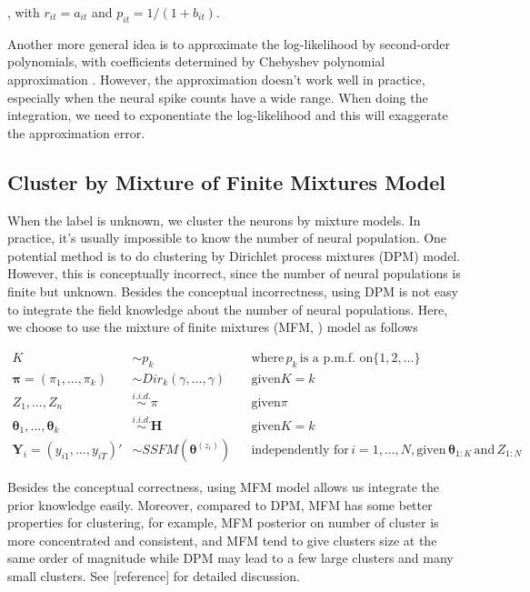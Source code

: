 \documentclass{article}
\begin{document}
	, with $r_{it} = a_{it}$ and $p_{it} = 1/(1 + b_{it})$.
	
	Another more general idea is to approximate the log-likelihood by second-order polynomials, with coefficients determined by Chebyshev polynomial approximation \citet{Keeley2019}. However, the approximation doesn’t work well in practice, especially when the neural spike counts have a wide range. When doing the integration, we need to exponentiate the log-likelihood and this will exaggerate the approximation error.
	
	\subsection{Cluster by Mixture of Finite Mixtures Model}
	When the label is unknown, we cluster the neurons by mixture models. In practice, it’s usually impossible to know the number of neural population. One potential method is to do clustering by Dirichlet process mixtures (DPM) model. However, this is conceptually incorrect, since the number of neural populations is finite but unknown. Besides the conceptual incorrectness, using DPM is not easy to integrate the field knowledge about the number of neural populations. Here, we choose to use the mixture of finite mixtures (MFM, \citet{Miller2018}) model as follows
	
	\begin{align*}
		K &\sim p_k &&\text{where}\, p_k \, \text{is a p.m.f. on} \{1,2,\ldots\}\\
		\bm{\pi}=(\pi_1,\ldots,\pi_k) &\sim Dir_k(\gamma, \ldots,\gamma) &&\text{given} K=k\\
		Z_1,\ldots,Z_n&\stackrel{i.i.d.}{\sim}\pi &&\text{given} \pi\\
		\bm{\theta}_1,\ldots,\bm{\theta}_k&\stackrel{i.i.d.}{\sim}\bm{H} &&\text{given} K=k\\
		\bm{Y}_i = (y_{i1},\ldots,y_{iT})' &\sim SSFM(\bm{\theta}^{(z_i)}) &&\text{independently for}\, i=1,\ldots,N, \text{given}\, \bm{\theta}_{1:K}\, \text{and}\, Z_{1:N}
	\end{align*}
	
	Besides the conceptual correctness, using MFM model allows us integrate the prior knowledge easily. Moreover, compared to DPM, MFM has some better properties for clustering, for example, MFM posterior on number of cluster is more concentrated and consistent, and MFM tend to give clusters size at the same order of magnitude while DPM may lead to a few large clusters and many small clusters. See [reference] for detailed discussion. 
	
\end{document}
